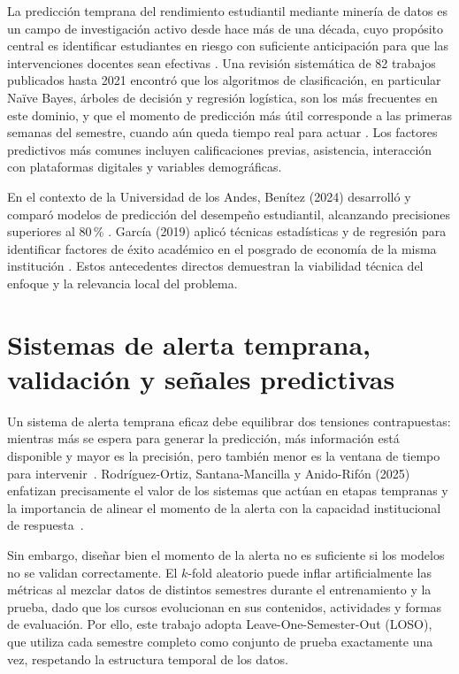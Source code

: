 \documentclass[12pt, letterpaper, openany]{report}
\begin{document}
La predicción temprana del rendimiento estudiantil mediante minería de datos es un campo de investigación activo desde hace más de una década, cuyo propósito central es identificar estudiantes en riesgo con suficiente anticipación para que las intervenciones docentes sean efectivas \cite{Lopez2021}. Una revisión sistemática de 82 trabajos publicados hasta 2021 encontró que los algoritmos de clasificación, en particular Naïve Bayes, árboles de decisión y regresión logística, son los más frecuentes en este dominio, y que el momento de predicción más útil corresponde a las primeras semanas del semestre, cuando aún queda tiempo real para actuar \cite{Lopez2021}. Los factores predictivos más comunes incluyen calificaciones previas, asistencia, interacción con plataformas digitales y variables demográficas.

En el contexto de la Universidad de los Andes, Benítez (2024) desarrolló y comparó modelos de predicción del desempeño estudiantil, alcanzando precisiones superiores al 80\,\% \cite{Benitez2024}. García (2019) aplicó técnicas estadísticas y de regresión para identificar factores de éxito académico en el posgrado de economía de la misma institución \cite{Garcia2019}. Estos antecedentes directos demuestran la viabilidad técnica del enfoque y la relevancia local del problema.

\section{Sistemas de alerta temprana, validación y señales predictivas}

Un sistema de alerta temprana eficaz debe equilibrar dos tensiones contrapuestas: mientras más se espera para generar la predicción, más información está disponible y mayor es la precisión, pero también menor es la ventana de tiempo para intervenir~\cite{Lopez2021}. Rodríguez-Ortiz, Santana-Mancilla y Anido-Rifón (2025) enfatizan precisamente el valor de los sistemas que actúan en etapas tempranas y la importancia de alinear el momento de la alerta con la capacidad institucional de respuesta~\cite{RodriguezOrtiz2025}.

Sin embargo, diseñar bien el momento de la alerta no es suficiente si los modelos no se validan correctamente. El $k$-fold aleatorio puede inflar artificialmente las métricas al mezclar datos de distintos semestres durante el entrenamiento y la prueba, dado que los cursos evolucionan en sus contenidos, actividades y formas de evaluación. Por ello, este trabajo adopta Leave-One-Semester-Out (LOSO), que utiliza cada semestre completo como conjunto de prueba exactamente una vez, respetando la estructura temporal de los datos.
\end{document}
